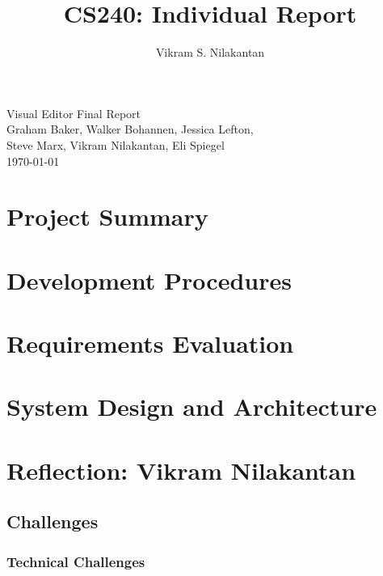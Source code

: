 \documentclass[a4paper]{article}
\title{CS240: Individual Report}
\author{Vikram S. Nilakantan}
\begin{document}

\begin{titlepage}
        \vspace*{\fill} %
        \begin{center}
                {\Huge Visual Editor Final Report}\\ [0.5cm]        
                
                {\Large Graham Baker, Walker Bohannen, Jessica Lefton, \\Steve Marx, Vikram Nilakantan, Eli Spiegel}\\[0.4cm]
                \today %
        \end{center}
        \vspace*{\fill}
\end{titlepage}

\section{Project Summary}

\section{Development Procedures}

\section{Requirements Evaluation}

\section{System Design and Architecture}

\section{Reflection: Vikram Nilakantan}
\subsection{Challenges}
\subsubsection{Technical Challenges}
\end{document}
